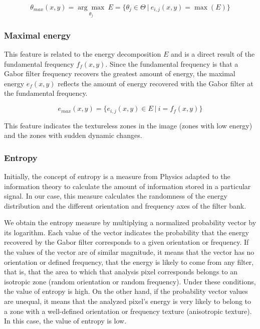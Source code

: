 \begin{equation}
	\theta_{max}(x,y) = \underset{\theta_{j}}{\arg\max} ~ E = \lbrace \theta_{j} \in \Theta ~|~ e_{i,j}(x, y) = \max(E)\rbrace 
\end{equation}

\subsubsection{Maximal energy}
This feature is related to the energy decomposition $E$ and is a direct result of the fundamental frequency $f_f(x,y)$. Since the fundamental frequency is that a Gabor filter frequency recovers the greatest amount of energy, the maximal energy $e_{f}(x,y)$ reflects the amount of energy recovered with the Gabor filter at the fundamental frequency.

\begin{equation}
	e_{max}(x,y) = \lbrace e_{i,j}(x,y) \in E ~|~ i = f_{f}(x,y) \rbrace \label{eq:max_energy}
\end{equation}

This feature indicates the textureless zones in the image (zones with low energy) and the zones with sudden dynamic changes.

\subsubsection{Entropy}
Initially, the concept of entropy is a measure from Physics adapted to the information theory to calculate the amount of information stored in a particular signal. In our case, this measure calculates the randomness of the energy distribution and the different orientation and frequency axes of the filter bank.

We obtain the entropy measure by multiplying a normalized probability vector by its logarithm. Each value of the vector indicates the probability that the energy recovered by the Gabor filter corresponds to a given orientation or frequency. If the values of the vector are of similar magnitude, it means that the vector has no orientation or defined frequency, that the energy is likely to come from any filter, that is, that the area to which that analysis pixel corresponds belongs to an isotropic zone (random orientation or random frequency). Under these conditions, the value of entropy is high. On the other hand, if the probability vector values are unequal, it means that the analyzed pixel's energy is very likely to belong to a zone with a well-defined orientation or frequency texture (anisotropic texture). In this case, the value of entropy is low.

